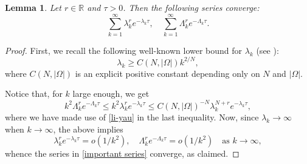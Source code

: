 \documentclass[a4paper,11pt]{article}
\newtheorem{lemma}[theorem]{Lemma}
\numberwithin{equation}{section}
\begin{document}
\begin{lemma}\label{lem some convergence estimate}
Let $r\in \mathbb{R}$ and $\tau>0$. Then the following series converge:
\begin{equation}\label{important series}
    \sum_{k=1}^\infty \lambda_k^r e^{-\lambda_k \tau}, \quad    \sum_{k=1}^\infty \Lambda_k^r e^{-\Lambda_k \tau}.
\end{equation}
\end{lemma}
\begin{proof}
First, we recall the following well-known lower bound for $\lambda_k$ (see \cite[Corollary~1]{li_yau1983schrodinger&eigenvalue_problem}): 
\begin{equation}\label{li-yau}
 \lambda_k\ge C(N,|\Omega|) k^{2/N},  
\end{equation}
where $C(N,|\Omega|)$ is an explicit positive constant depending only on $N$ and $|\Omega|$.

Notice that, for $k$ large enough, we get
\begin{equation*}
 k^2\Lambda_k^r e^{-\Lambda_k \tau}\le k^2\lambda_k^r e^{-\lambda_k\tau}\le C(N,|\Omega|)^{-N} \lambda_k^{N+r}e^{-\lambda_k \tau},
\end{equation*}
where we have made use of \eqref{li-yau} in the last inequality. 
Now, since $\lambda_k\to\infty$ when $k\to\infty$, the above implies
\begin{equation*}
\lambda_k^r e^{-\lambda_k \tau} = o(1/k^2), \quad \Lambda_k^r e^{-\Lambda_k \tau} = o(1/k^2) \quad \text{as }k\to\infty, 
\end{equation*}
whence the series in \eqref{important series} converge, as claimed. 
\end{proof}
\end{document}
